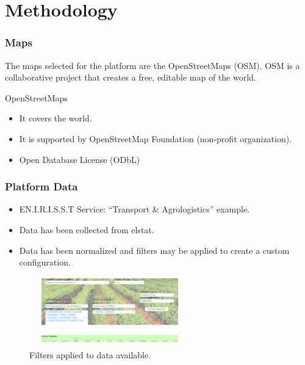 \documentclass{beamer}
\begin{document}
   \section{Methodology}
    \begin{frame}
    \frametitle{Maps}
    The maps selected for the platform are the OpenStreetMaps (OSM).
    OSM is a collaborative project that creates a free, editable map of the world.
    
    \begin{block}{OpenStreetMaps}
		\begin{itemize}
        	\item It covers the world.
        	\item It is supported by OpenStreetMap Foundation (non-profit organization).
        	\item Open Database License (ODbL)
    	\end{itemize}
	\end{block}
    
    \end{frame}
    
    \begin{frame}
    \frametitle{Platform Data}
    
    \begin{itemize}
    	\item EN.I.R.I.S.S.T Service: “Transport \& Agrologistics” example.
        \item Data has been collected from elstat.
        \item Data has been normalized and filters may be applied to create a custom configuration.
    \end{itemize}
    
    \begin{figure}[h]
    \centering
    \includegraphics[width=7cm, height=3cm]{1_platform_filters}
    \caption{Filters applied to data available.}
    \label{fig:filters1}
    \end{figure}
    
    \end{frame}
    
\end{document}
